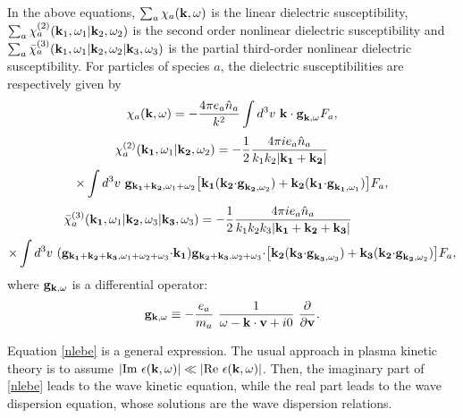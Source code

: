 \documentclass[12pt,a4paper,ruledheader]{report}
\begin{document}
In the above equations, $\sum_a \chi_a({\bf k},\omega)$
is the linear dielectric susceptibility,
$\sum_a \chi_a^{(2)}({\bf k}_1,\omega_1|{\bf k}_2,\omega_2)$ is the
second order nonlinear dielectric susceptibility and
$\sum_a \bar \chi_a^{(3)}({\bf k}_1,\omega_1|{\bf k}_2,\omega_2|{\bf k}_3,\omega_3)$
is the partial third-order nonlinear dielectric susceptibility.
For particles of species $a$, the dielectric susceptibilities
are respectively given by
\begin{equation}
\chi_a({\bf k},\omega)=-\frac{4\pi e_a\hat n_a}{k^2}
\int d^3v\ {\bf k \cdot g}_{{\bf k},\omega}F_a,
\end{equation}
\begin{equation}
\begin{split}
\chi_a^{(2)}({\bf k_1},\omega_1|{\bf k_2},\omega_2)
&=-\frac{1}{2}\frac{4\pi ie_a\hat n_a}{k_1k_2|{\bf k_1}+{\bf k_2}|}\\
\times\int d^3v\ {\bf g}_{{\bf k_1}+{\bf k_2}, \omega_1+\omega_2}
\bigl[{\bf k_1}&({\bf k_2}{\bf \cdot g}_{{\bf k_2},\omega_2})
 +{\bf k_2}({\bf k_1}{\bf \cdot g}_{{\bf k_1},\omega_1})\bigr]F_a,
\end{split}
\end{equation}
\begin{equation}
\begin{split}
  \bar \chi_a^{(3)}({\bf k_1},\omega_1|{\bf k_2},\omega_3|{\bf k_3},\omega_3)
  &=-\frac{1}{2}\frac{4\pi i e_a\hat n_a}{k_1k_2k_3|{\bf k_1}+{\bf k_2}+{\bf k_3}|}\\
  \times\int d^3v\
  ({\bf g}_{{\bf k_1}+{\bf k_2}+{\bf k_3}, \omega_1+\omega_2+\omega_3}{\bf \cdot k_1})
  {\bf g}&_{{\bf k_2}+{\bf k_3},\omega_2+\omega_3}{\bf \cdot}
  \bigl[{ \bf k_2}({\bf k_3}{\bf \cdot g}_{{\bf k_3},\omega_3})
  +{\bf k_3}({\bf k_2}{\bf \cdot g}_{{\bf k_2},\omega_2})\bigr]F_a,
\end{split}
\end{equation}
where ${\bf g}_{{\bf k},\omega}$ is a differential operator:
\begin{equation}
\label{op-dif}
  {\bf g}_{{\bf k},\omega}\equiv-\frac{e_a}{m_a}\
   \frac{1}{\omega-{\bf k \cdot v}+i0}\ \frac{\partial}{\partial \bf v}.
\end{equation}

Equation \eqref{nlebe} is a general expression. The usual
approach in plasma kinetic theory is to assume $|\mbox{Im}\
\epsilon({\bf k},\omega)|\ll|\mbox{Re}\ \epsilon({\bf k},\omega)|$.
Then, the imaginary part of \eqref{nlebe} leads to the wave kinetic
equation, while the real part leads to the wave dispersion equation,
whose solutions 
are the wave dispersion relations.
\end{document}
